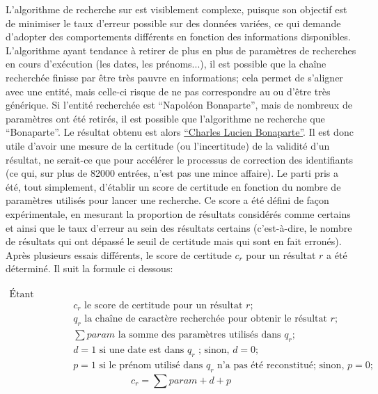 L'algorithme de recherche sur \wkd{} est visiblement complexe, puisque son objectif est de minimiser le taux d'erreur possible sur des données variées, ce qui demande d'adopter des comportements différents en fonction des informations disponibles. L'algorithme ayant tendance à retirer de plus en plus de paramètres de recherches en cours d'exécution (les dates, les prénoms...), il est possible que la chaîne recherchée finisse par être très pauvre en informations; cela permet de s'aligner avec une entité, mais celle-ci risque de ne pas correspondre au \tname{} ou d'être très générique. Si l'entité recherchée est \enquote{Napoléon Bonaparte}, mais de nombreux de paramètres ont été retirés, il est possible que l'algorithme ne recherche que \enquote{Bonaparte}. Le résultat obtenu est alors \href{https://www.wikidata.org/w/index.php?search=bonaparte&search=bonaparte&title=Special%3ASearch&go=Go&ns0=1&ns120=1}{\enquote{Charles Lucien Bonaparte}}. Il est donc utile d'avoir une mesure de la certitude (ou l'incertitude) de la validité d'un résultat, ne serait-ce que pour accélérer le processus de correction des identifiants (ce qui, sur plus de 82000 entrées, n'est pas une mince affaire). Le parti pris a été, tout simplement, d'établir un score de certitude en fonction du nombre de paramètres utilisés pour lancer une recherche. Ce score a été défini de façon expérimentale, en mesurant la proportion de résultats considérés comme certains et ainsi que le taux d'erreur au sein des résultats certains (c'est-à-dire, le nombre de résultats qui ont dépassé le seuil de certitude mais qui sont en fait erronés). Après plusieurs essais différents, le score de certitude \(c_r\) pour un résultat \(r\) a été déterminé. Il suit la formule ci dessous:

\begin{align*}
	\text{Étant donnés:} \\ 
	&c_r \text{ le score de certitude pour un résultat } r \text{;}\\
	&q_r \text{ la chaîne de caractère recherchée pour obtenir le résultat } r \text{;}\\
	&\sum param \text{ la somme des paramètres utilisés dans } q_r \text{;} \\
	&d = 1 \text{ si une date est dans } q_r \text{ ; sinon, } d = 0 \text{;} \\
	&p = 1 \text{ si le prénom utilisé dans } q_r \text{ n'a pas été reconstitué; sinon, } p = 0 \text{;}
\end{align*}
\begin{displaymath}
	c_r = \sum param + d + p
\end{displaymath}

